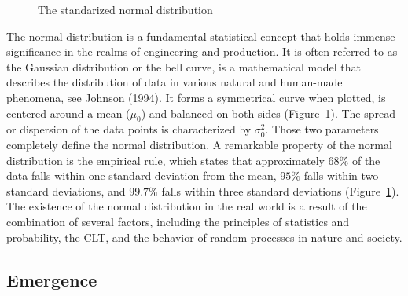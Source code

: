 \documentclass[
  a4paper,
]{scrbook}
\begin{document}
\begin{figure}[ht]


\caption{\label{fig-normal-dist}The standarized normal distribution}

\end{figure}%

The normal distribution is a fundamental statistical concept that holds
immense significance in the realms of engineering and production. It is
often referred to as the Gaussian distribution or the bell curve, is a
mathematical model that describes the distribution of data in various
natural and human-made phenomena, see Johnson (1994). It forms a
symmetrical curve when plotted, is centered around a mean
(\hyperref[truemean-gloss]{\(\mu_0\)}) and balanced on both sides
(Figure~\ref{fig-normal-dist}). The spread or dispersion of the data
points is characterized by
\hyperref[truevariance-gloss]{\(\sigma_0^2\)}. Those two parameters
completely define the normal distribution. A remarkable property of the
normal distribution is the empirical rule, which states that
approximately \(68\%\) of the data falls within one standard deviation
from the mean, \(95\%\) falls within two standard deviations, and
\(99.7\%\) falls within three standard deviations
(Figure~\ref{fig-normal-dist}). The existence of the normal distribution
in the real world is a result of the combination of several factors,
including the principles of statistics and probability, the
\hyperref[acronyms_CLT]{CLT}, and the behavior of random processes in
nature and society.

\subsection{Emergence}\label{emergence}
\end{document}
